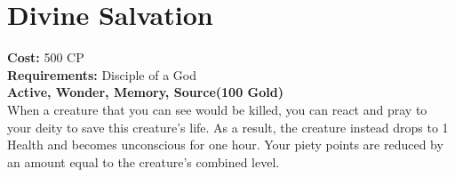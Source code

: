 \section{Divine Salvation}
\textbf{Cost:} 500 CP\\
\textbf{Requirements:} Disciple of a God\\
\textbf{Active, Wonder, Memory, Source(100 Gold)}\\
When a creature that you can see would be killed, you can react and pray to your deity to save this creature's life. As a result, the creature instead drops to 1 Health and becomes unconscious for one hour. Your piety points are reduced by an amount equal to the creature's combined level.\\
\\